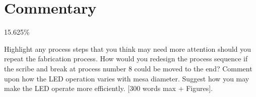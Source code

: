 \section{Commentary}
\label{sec:comment}

15.625\%

Highlight any process steps that you think may need more attention should you repeat the fabrication process.
How would you redesign the process sequence if the scribe and break at process number 8 could be moved to the end? Comment upon how the LED operation varies with mesa diameter. Suggest how you may make the LED operate more efficiently. [300 words max + Figures].
